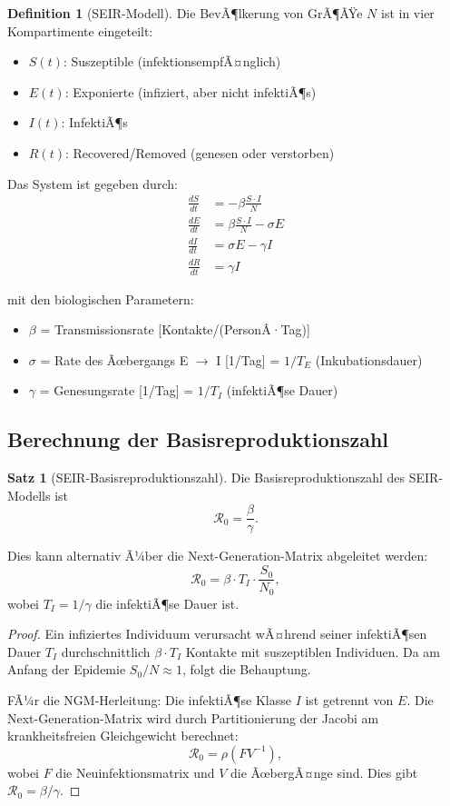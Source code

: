 ﻿\documentclass[a4paper,12pt]{article}
\theoremstyle{definition}
\newtheorem{definition}{Definition}
\newtheorem{satz}{Satz}
\begin{document}
\begin{definition}[SEIR-Modell]
Die BevÃ¶lkerung von GrÃ¶ÃŸe $N$ ist in vier Kompartimente eingeteilt:
\begin{itemize}
\item $S(t)$: Suszeptible (infektionsempfÃ¤nglich)
\item $E(t)$: Exponierte (infiziert, aber nicht infektiÃ¶s)
\item $I(t)$: InfektiÃ¶s
\item $R(t)$: Recovered/Removed (genesen oder verstorben)
\end{itemize}

Das System ist gegeben durch:
\begin{align}
\frac{dS}{dt} &= -\beta \frac{S \cdot I}{N} \label{eq:seir_s}\\
\frac{dE}{dt} &= \beta \frac{S \cdot I}{N} - \sigma E \label{eq:seir_e}\\
\frac{dI}{dt} &= \sigma E - \gamma I \label{eq:seir_i}\\
\frac{dR}{dt} &= \gamma I \label{eq:seir_r}
\end{align}

mit den biologischen Parametern:
\begin{itemize}
\item $\beta$ = Transmissionsrate [Kontakte/(PersonÂ·Tag)]
\item $\sigma$ = Rate des Ãœbergangs E $\to$ I [1/Tag] = $1/T_E$ (Inkubationsdauer)
\item $\gamma$ = Genesungsrate [1/Tag] = $1/T_I$ (infektiÃ¶se Dauer)
\end{itemize}
\end{definition}

\subsection{Berechnung der Basisreproduktionszahl}

\begin{satz}[SEIR-Basisreproduktionszahl]
Die Basisreproduktionszahl des SEIR-Modells ist
\[
\mathcal{R}_0 = \frac{\beta}{\gamma}.
\]

Dies kann alternativ Ã¼ber die Next-Generation-Matrix abgeleitet werden:
\[
\mathcal{R}_0 = \beta \cdot T_I \cdot \frac{S_0}{N_0},
\]
wobei $T_I = 1/\gamma$ die infektiÃ¶se Dauer ist.
\end{satz}

\begin{proof}
Ein infiziertes Individuum verursacht wÃ¤hrend seiner infektiÃ¶sen Dauer $T_I$ durchschnittlich $\beta \cdot T_I$ Kontakte mit suszeptiblen Individuen. Da am Anfang der Epidemie $S_0/N \approx 1$, folgt die Behauptung.

FÃ¼r die NGM-Herleitung: Die infektiÃ¶se Klasse $I$ ist getrennt von $E$. Die Next-Generation-Matrix wird durch Partitionierung der Jacobi am krankheitsfreien Gleichgewicht berechnet:
\[
\mathcal{R}_0 = \rho(FV^{-1}),
\]
wobei $F$ die Neuinfektionsmatrix und $V$ die ÃœbergÃ¤nge sind. Dies gibt $\mathcal{R}_0 = \beta / \gamma$.
\end{proof}
\end{document}
